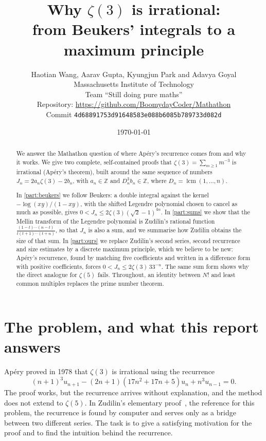 \documentclass[11pt]{article}
\title{Why \texorpdfstring{$\zeta(3)$}{zeta(3)} is irrational:\\ from Beukers' integrals to a maximum principle}
\author{Haotian Wang, Aarav Gupta, Kyungjun Park and Adavya Goyal\\[2pt] \small Massachusetts Institute of Technology\\ \small Team ``Still doing pure maths''\\[2pt] \footnotesize Repository: \url{https://github.com/BoomydayCoder/Mathathon}\\ \footnotesize Commit \texttt{4d68891753d91648583e088b6085b789733d082d}}
\date{\today}
\newcommand{\Z}{\mathbb{Z}}
\newcommand{\Dn}{D_n}
\DeclareMathOperator{\lcm}{lcm}
\theoremstyle{plain}
\theoremstyle{definition}
\theoremstyle{remark}
\begin{document}
\maketitle

\begin{abstract}
We answer the Mathathon question of where Ap\'ery's recurrence comes from and why it works. We give
two complete, self-contained proofs that $\zeta(3)=\sum_{m\ge1}m^{-3}$ is irrational
(Ap\'ery's theorem), built around the same sequence of numbers $J_n=2a_n\zeta(3)-2b_n$, with
$a_n\in\Z$ and $\Dn^3b_n\in\Z$, where $\Dn=\lcm(1,\dots,n)$.

In \cref{part:beukers} we follow Beukers: a double integral against the kernel
$-\log(xy)/(1-xy)$, with the shifted Legendre polynomial chosen to cancel as much as possible,
gives $0<J_n\le2\zeta(3)(\sqrt2-1)^{4n}$. In \cref{part:sums} we show that the Mellin transform of
the Legendre polynomial is Zudilin's rational function $\frac{(1-t)\cdots(n-t)}{t(t+1)\cdots(t+n)}$,
so that $J_n$ is also a sum, and we summarise how Zudilin obtains the size of that sum. In
\cref{part:ours} we replace Zudilin's second series, second recurrence and size estimates by a
discrete maximum principle, which we believe to be new: Ap\'ery's recurrence, found by matching five
coefficients and written in a difference form with positive coefficients, forces
$0<J_n\le2\zeta(3)\,33^{-n}$. The same sum form shows why the direct analogue for $\zeta(5)$
fails. Throughout, an identity between $N!$ and least common multiples replaces the prime number
theorem.
\end{abstract}

\tableofcontents

\section{The problem, and what this report answers}\label{sec:problem}

Ap\'ery proved in 1978 that $\zeta(3)$ is irrational using the recurrence
\begin{equation}\label{eq:apery-rec}
  (n+1)^3u_{n+1}-(2n+1)(17n^2+17n+5)u_n+n^3u_{n-1}=0 .
\end{equation}
The proof works, but the recurrence arrives without explanation, and the method does not extend to
$\zeta(5)$. In Zudilin's elementary proof~\cite{zudilin}, the reference for this problem, the
recurrence is found by computer and serves only as a bridge between two different series. The task
is to give a satisfying motivation for the proof and to find the intuition behind the recurrence.
\end{document}
